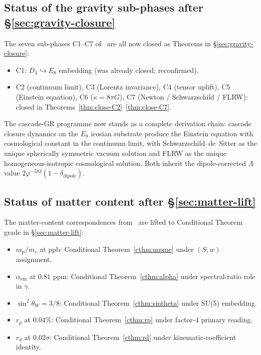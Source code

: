 \documentclass[11pt]{article}
\theoremstyle{plain}
\theoremstyle{definition}
\theoremstyle{remark}
\begin{document}
\subsection{Status of the gravity sub-phases after \S\ref{sec:gravity-closure}}

The seven sub-phases C1--C7 of~\citet{cascadeGR} are all now closed as Theorems in \S\ref{sec:gravity-closure}:
\begin{itemize}[leftmargin=2em]
\item C1: $D_4 \hookrightarrow E_8$ embedding (was already closed; reconfirmed).
\item C2 (continuum limit), C3 (Lorentz invariance), C4 (tensor uplift), C5 (Einstein equation), C6 ($\kappa = 8\pi G$), C7 (Newton / Schwarzschild / FLRW): closed in Theorems~\ref{thm:close-C2}--\ref{thm:close-C7}.
\end{itemize}

The cascade-GR programme now stands as a complete derivation chain: cascade closure dynamics on the $E_8$ icosian substrate produce the Einstein equation with cosmological constant in the continuum limit, with Schwarzschild--de~Sitter as the unique spherically symmetric vacuum solution and FLRW as the unique homogeneous-isotropic cosmological solution. Both inherit the dipole-corrected $\Lambda$ value $2\varphi^{-583}(1 - \delta_\mathrm{dipole})$.

\subsection{Status of matter content after \S\ref{sec:matter-lift}}

The matter-content correspondences from~\citet{SmartV, SmartXXII, SmartXXXII} are lifted to Conditional Theorem grade in \S\ref{sec:matter-lift}:
\begin{itemize}[leftmargin=2em]
\item $m_p/m_e$ at ppb: Conditional Theorem~\ref{cthm:mpme} under $(S,w)$ assignment.
\item $\alpha_\mathrm{em}$ at $0.81$ ppm: Conditional Theorem~\ref{cthm:alpha} under spectral-ratio role in $\gamma$.
\item $\sin^2\theta_W = 3/8$: Conditional Theorem~\ref{cthm:sintheta} under SU(5) embedding.
\item $r_p$ at $0.04\%$: Conditional Theorem~\ref{cthm:rp} under factor-$4$ primary reading.
\item $r_d$ at $0.02\sigma$: Conditional Theorem~\ref{cthm:rd} under kinematic-coefficient identity.
\end{itemize}
\end{document}
